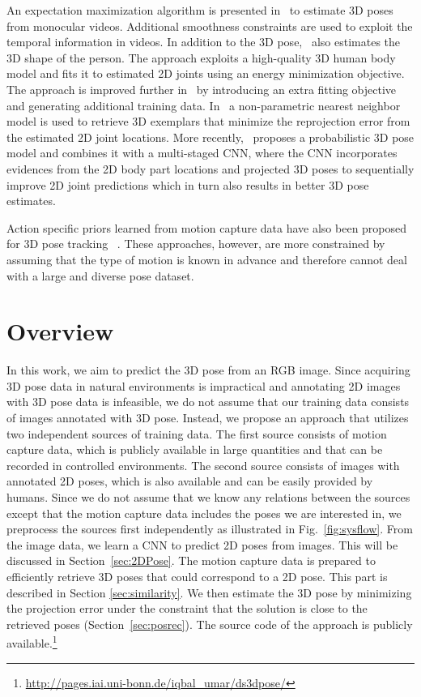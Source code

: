 \documentclass[10pt,journal,compsoc]{IEEEtran}
\begin{document}
An expectation maximization algorithm is presented in~\cite{zhou2015sparse} to estimate 3D poses from monocular videos. 
Additional smoothness constraints are used to exploit the temporal information in videos. 
In addition to the 3D pose,~\cite{bogo2016keep} also estimates the 3D shape of the person. The approach exploits a high-quality 3D human body model and fits
it to estimated 2D joints using an energy minimization objective. The approach is improved further in~\cite{lassner2017unite} by introducing an extra fitting objective and generating additional training data. In~\cite{chen2017matching} a non-parametric nearest neighbor model is used to retrieve 3D exemplars 
that minimize the reprojection error from the estimated 2D joint locations. More recently,~\cite{tome2017lifting} proposes a probabilistic 3D pose model and combines it with a multi-staged 
CNN, where the CNN incorporates evidences from the 2D body part locations and projected 3D poses to sequentially improve 2D joint predictions which in turn also results in better 3D pose estimates. 

Action specific priors learned from motion capture data have also been proposed for 3D pose tracking ~\cite{UrtasunFF06,andrilukaCVPR2010}. 
These approaches, however, are more constrained by assuming that the type of motion is known in advance and 
therefore cannot deal with a large and diverse pose dataset. 

\section{Overview}\label{sec:overview}
In this work, we aim to predict the 3D pose from an RGB image. Since acquiring 3D pose data in natural 
environments is impractical and annotating 2D images with 3D pose data is infeasible, we do not assume that
our training data consists of images annotated with 3D pose. Instead, we propose an approach that utilizes two
independent sources of training data. The first source consists of motion capture data, which is publicly
available in large quantities and that can be recorded in controlled environments. The second source consists of 
images with annotated 2D poses, which is also available and can be easily provided by humans. Since we do not assume
that we know any relations between the sources except that the motion capture data includes the poses we are
interested in, we preprocess the sources first independently as illustrated in Fig.~\ref{fig:sysflow}. From the 
image data, we learn a CNN to predict 2D poses from images. This will be discussed 
in Section~\ref{sec:2DPose}. The motion capture data is prepared to efficiently retrieve 3D poses that could 
correspond to a 2D pose. This part is described in Section \ref{sec:similarity}. We then estimate the 3D pose by minimizing the projection 
error under the constraint that the solution is close to the retrieved poses (Section~\ref{sec:posrec}). The source code of the approach is publicly available.\footnote{\url{http://pages.iai.uni-bonn.de/iqbal_umar/ds3dpose/}}
\end{document}
